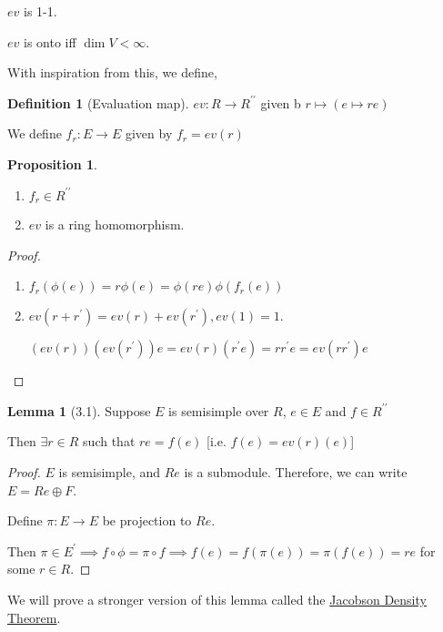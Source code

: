 \documentclass{article}
\theoremstyle{definition}
\newtheorem*{definition}{Definition}
\newtheorem{proposition}[theorem]{Proposition}
\newtheorem{lemma}[theorem]{Lemma}
\begin{document}
\(ev\) is 1-1.

\(ev\) is onto iff \(\dim V < \infty\).

With inspiration from this, we define,

\begin{definition}
    [Evaluation map] \(ev: R \to R^{\prime\prime}\) given b \(r \mapsto (e \mapsto re)\) 

    We define \(f_r : E \to E\) given by \(f_r = ev(r)\)
\end{definition}

\begin{proposition}
    \begin{enumerate}[label=\alph*)]
        \item \(f_r \in R^{\prime\prime} \)
        \item \(ev\) is a ring homomorphism. 
    \end{enumerate} 
\end{proposition}

\begin{proof}
    \begin{enumerate}[label=\alph*)]
        \item \(f_r(\phi(e))= r\phi(e) = \phi(re) \phi(f_r(e))\)
        \item \(ev(r + r^{\prime}) = ev(r) + ev(r^{\prime}), ev(1)=1\).
        
        \((ev(r))(ev(r^{\prime}))e = ev(r)(r^{\prime} e) = r r^{\prime} e = ev(r r^{\prime})e\) 
    \end{enumerate} 
\end{proof}

\begin{lemma}
    [3.1] Suppose \(E\) is semisimple over \(R\), \(e\in E\) and \(f\in R^{\prime\prime}\) 

    Then \(\exists r\in R\) such that \(re = f(e)\) [i.e. \(f(e) = ev(r)(e)\)]
\end{lemma}

\begin{proof}
    \(E\) is semisimple, and \(Re\) is a submodule. Therefore, we can write \(E = R e \oplus F\).

    Define \(\pi : E \to E\) be projection to \(R e\).

    Then \(\pi \in E^{\prime} \implies f\circ\phi = \pi \circ f \implies f(e)=f(\pi(e))=\pi(f(e))= re\) for some \(r\in R\).
\end{proof}

We will prove a stronger version of this lemma called the \underline{Jacobson Density Theorem}.
\end{document}
